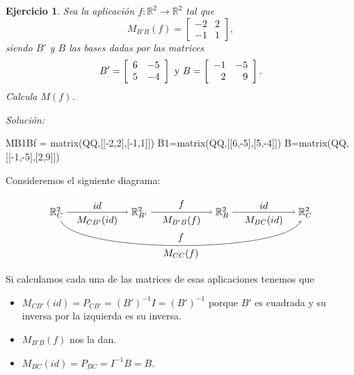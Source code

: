 \documentclass{amsart}
\newtheorem{ejer}{Ejercicio}
\def\r{\mathbb{R}}
\begin{document}

\begin{ejer} 
Sea la aplicación $f: \r ^2\to \r ^2$ tal que 
\[ M_{B'B}(f) = \left[ \begin{array}{rr} -2 & 2 \\  -1 & 1 \end{array} \right], \]  siendo $B'$ y $B$ las bases dadas por las matrices 
\[ B' = \left[ \begin{array}{rr} 6 & -5\\ 5 & -4 \end{array} \right] \ \hbox{y} \ B = \left[ \begin{array}{rr} -1 & -5\\ 2 & 9  \end{array} \right].  \] Calcula $M(f)$.
\end{ejer}

{\it Soluci\'on:}

\begin{sageblock}
MB1Bf = matrix(QQ,[[-2,2],[-1,1]])
B1=matrix(QQ,[[6,-5],[5,-4]])
B=matrix(QQ,[[-1,-5],[2,9]])
\end{sageblock}

Consideremos el siguiente diagrama:

$$
\begin{tikzpicture}[xscale = 1.5]
\node (RCa) at (0,0) {$\r^2_C$};
\node (RBp) at (2,0) {$\r^2_{B'}$};
\node (RB)  at (4,0) {$\r^2_B$};
\node (RCb) at (6,0) {$\r^2_C$};
\draw[->] (RCa) to node [above] {$id$} 
                   node [below] {$M_{CB'}(id)$} (RBp);
\draw[->] (RBp) to node [above] {$f$} 
                   node [below] {$M_{B'B}(f)$} (RB); 
\draw[->] (RB)  to node [above] {$id$} 
                   node [below] {$M_{BC}(id)$} (RCb);
\draw[->] (RCa) .. controls (0.5,-1.5) and (5.5,-1.5) .. 
                node [below] {$M_{CC}(f)$} 
                node [above] {$f$} (RCb);
\end{tikzpicture}
$$

Si calculamos cada una de las matrices de esas aplicaciones tenemos que
\begin{itemize}
\item $M_{CB'}(id) = P_{CB'} = (B')^{-1}I = (B')^{-1}$ porque $B'$ es cuadrada
y su inversa por la izquierda es su inversa.
\item $M_{B'B}(f)$ nos la dan.
\item $M_{BC}(id) = P_{BC} = I^{-1}B= B$. 
\end{itemize}
\end{document}
